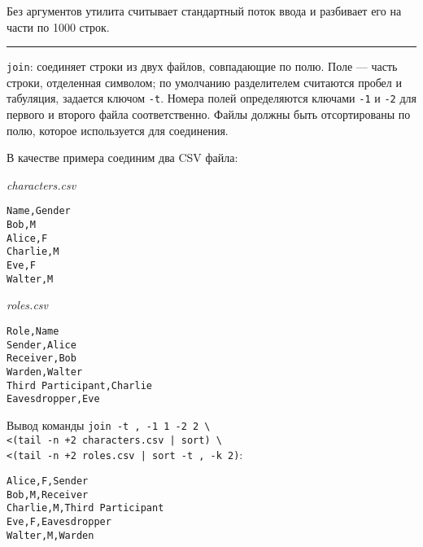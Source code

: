 \documentclass[listings]{labreport}
\begin{document}
Без аргументов утилита считывает стандартный поток ввода и разбивает его на части по 1000 строк.

\noindent\rule{\textwidth}{1pt}

\texttt{join}: соединяет строки из двух файлов, совпадающие по полю. Поле — часть строки, отделенная символом;
по умолчанию разделителем считаются пробел и табуляция, задается ключом \texttt{-t}. Номера полей определяются
ключами \texttt{-1} и \texttt{-2} для первого и второго файла соответственно. Файлы должны быть отсортированы по
полю, которое используется для соединения.

В качестве примера соединим два CSV файла:

\begin{multicols}{2}
\noindent\textit{characters.csv}
\begin{verbatim}
Name,Gender
Bob,M
Alice,F
Charlie,M
Eve,F
Walter,M
\end{verbatim}

\noindent\textit{roles.csv}
\begin{verbatim}
Role,Name
Sender,Alice
Receiver,Bob
Warden,Walter
Third Participant,Charlie
Eavesdropper,Eve
\end{verbatim}
\end{multicols}

Вывод команды \texttt{join -t , -1 1 -2 2 {\textbackslash}} \\
\texttt{<(tail -n +2 characters.csv | sort) {\textbackslash}} \\
\texttt{<(tail -n +2 roles.csv | sort -t , -k 2)}:

\begin{verbatim}
Alice,F,Sender
Bob,M,Receiver
Charlie,M,Third Participant
Eve,F,Eavesdropper
Walter,M,Warden
\end{verbatim}
\end{document}
